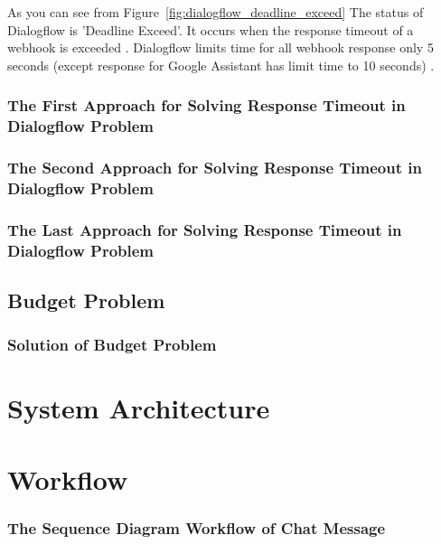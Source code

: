 \documentclass[12pt,oneside,openright,a4paper]{cpe-english-project}
\begin{document}
As you can see from Figure~\ref*{fig:dialogflow_deadline_exceed}
The status of Dialogflow is 'Deadline Exceed'. It occurs when the response timeout of a webhook is exceeded
\cite{dialogflow_time_out}. Dialogflow limits time for all webhook response only 5 seconds (except response for
Google Assistant has limit time to 10 seconds) \cite{dialogflow_response_time}.

\subsubsection{The First Approach for Solving Response Timeout in Dialogflow Problem}
\subsubsection{The Second Approach for Solving Response Timeout in Dialogflow Problem}
\subsubsection{The Last Approach for Solving Response Timeout in Dialogflow Problem}

\subsection{Budget Problem}
\subsubsection{Solution of Budget Problem}


\section{System Architecture}


\section{Workflow}
\subsubsection{The Sequence Diagram Workflow of Chat Message}
\end{document}
